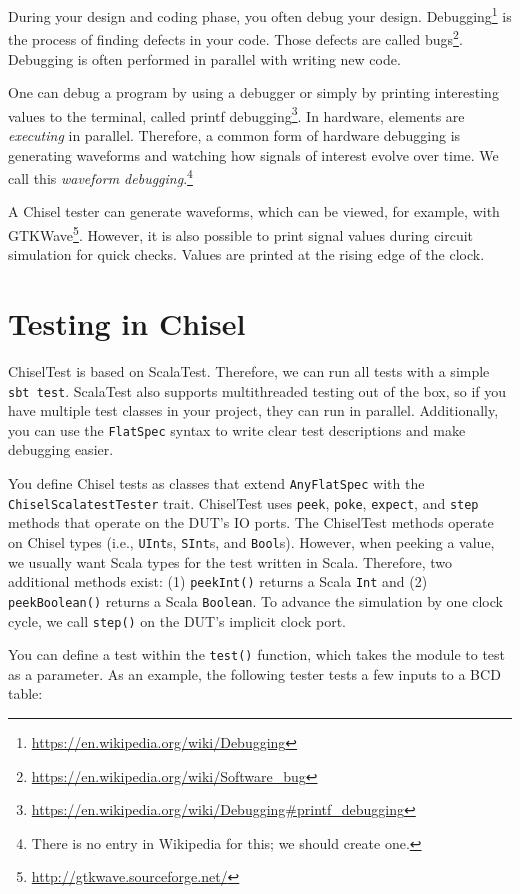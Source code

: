\documentclass[%
    10pt,
    headinclude, footinclude=false,
    openright, %
    notitlepage,
    cleardoublepage=empty,
    headsepline,
    numbers=noenddot,
    bibliography=totoc, index=totoc,
    ]{scrbook}
\newcommand{\code}[1]{{\lstinline[basicstyle=\small\ttfamily]{#1}}}
\newcommand{\myref}[2]{\href{#1}{#2}}
\renewcommand{\myref}[2]{{#2}{\footnote{\url{#1}}}}
\begin{document}
During your design and coding phase, you often debug your design.
\myref{https://en.wikipedia.org/wiki/Debugging}{Debugging} is the process of
finding defects in your code. Those defects are called
\myref{https://en.wikipedia.org/wiki/Software_bug}{bugs}.
Debugging is often performed in parallel with writing new code.

One can debug a program by using a debugger or simply by printing interesting
values to the terminal, called \myref{https://en.wikipedia.org/wiki/Debugging\#printf\_debugging}{printf debugging}.
In hardware, elements are \emph{executing} in parallel. Therefore, a common form of hardware
debugging is generating waveforms and watching how signals of interest evolve over time.
We call this \emph{waveform debugging}.\footnote{There is no entry in Wikipedia for this;
we should create one.}

A Chisel tester can generate waveforms, which can be viewed, for example, with \myref{http://gtkwave.sourceforge.net/}{GTKWave}.
However, it is also possible to print signal values during circuit simulation for quick checks.
Values are printed at the rising edge of the clock.


\section{Testing in Chisel}

ChiselTest is based on ScalaTest. Therefore, we can run all tests with a simple \code{sbt test}.
ScalaTest also supports multithreaded testing out of the box, so if you have multiple
test classes in your project, they can run in parallel. Additionally, you can use
the \code{FlatSpec} syntax to write clear test descriptions and make debugging easier.

You define Chisel tests as classes that extend \code{AnyFlatSpec} with
the\\ \code{ChiselScalatestTester} trait. ChiselTest uses \code{peek},
\code{poke}, \code{expect}, and \code{step} methods that operate on the DUT's IO ports.
The ChiselTest methods operate on Chisel types (i.e., \code{UInt}s,
\code{SInt}s, and \code{Bool}s). However, when peeking a value, we
usually want Scala types for the test written in Scala.
Therefore, two additional methods exist: (1) \code{peekInt()} returns a
Scala \code{Int} and (2) \code{peekBoolean()} returns a Scala \code{Boolean}.
To advance the simulation by one clock cycle,
we call \code{step()} on the DUT's implicit clock port.

You can define a test within the \code{test()} function, which takes the module to test as
a parameter. As an example, the following tester tests a few inputs to a BCD table:
\end{document}
